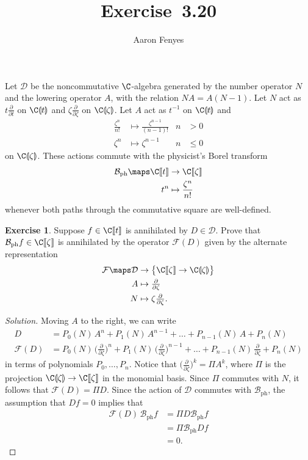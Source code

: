 \documentclass{article}
\title{Exercise~3.20}
\author{Aaron Fenyes}
\theoremstyle{definition}
\newtheorem*{exr}{Exercise}
\theoremstyle{plain}
\newcommand{\phborel}{\mathcal{B}_\text{ph}}
\newcommand{\dict}{\mathcal{F}}
\begin{document}
\maketitle
Let $\mathcal{D}$ be the noncommutative $\C$-algebra generated by the number operator $N$ and the lowering operator $A$, with the relation $NA = A(N-1)$. Let $N$ act as $t \tfrac{\partial}{\partial t}$ on $\C\llparenthesis t \rrparenthesis$ and $\zeta \tfrac{\partial}{\partial \zeta}$ on $\C\llparenthesis \zeta \rrparenthesis$. Let $A$ act as $t^{-1}$ on $\C\llparenthesis t \rrparenthesis$ and
\begin{align*}
\frac{\zeta^n}{n!} & \mapsto \frac{\zeta^{n-1}}{(n-1)!} & n & > 0 \\
\zeta^n & \mapsto \zeta^{n-1} & n & \le 0
\end{align*}
on $\C\llparenthesis \zeta \rrparenthesis$. These actions commute with the physicist's Borel transform
\begin{align*}
\phborel \maps \C\llbracket t \rrbracket & \to \C\llbracket \zeta \rrbracket \\
t^n & \mapsto \frac{\zeta^n}{n!}
\end{align*}
whenever both paths through the commutative square are well-defined.
\begin{exr}
Suppose $f \in \C\llbracket t \rrbracket$ is annihilated by $D \in \mathcal{D}$. Prove that $\phborel f \in \C\llbracket \zeta \rrbracket$ is annihilated by the operator $\dict(D)$ given by the alternate representation
\begin{align*}
\dict \maps \mathcal{D} & \to \big\{\C\llbracket \zeta \rrbracket \to \C\llparenthesis \zeta \rrparenthesis\big\} \\
A & \mapsto \tfrac{\partial}{\partial \zeta} \\
N & \mapsto \zeta \tfrac{\partial}{\partial \zeta}.
\end{align*}
\end{exr}
\begin{proof}[Solution]
Moving $A$ to the right, we can write
\begin{align*}
D & = P_0(N)\,A^n + P_1(N)\,A^{n-1} + \ldots + P_{n-1}(N)\,A + P_n(N) \\
\dict(D) & = P_0(N)\,\big(\tfrac{\partial}{\partial \zeta}\big)^n + P_1(N)\,\big(\tfrac{\partial}{\partial \zeta}\big)^{n-1} + \ldots + P_{n-1}(N)\,\tfrac{\partial}{\partial \zeta} + P_n(N)
\end{align*}
in terms of polynomials $P_0, \ldots, P_n$. Notice that $\big(\tfrac{\partial}{\partial \zeta}\big)^k = \Pi A^k$, where $\Pi$ is the projection $\C\llparenthesis \zeta \rrparenthesis \to \C\llbracket \zeta \rrbracket$ in the monomial basis. Since $\Pi$ commutes with $N$, it follows that $\dict(D) = \Pi D$. Since the action of $\mathcal{D}$ commutes with $\phborel$, the assumption that $Df = 0$ implies that
\begin{align*}
\dict(D)\,\phborel f & = \Pi D \phborel f \\
& = \Pi \phborel Df \\
& = 0.
\end{align*}
\end{proof}
\end{document}
